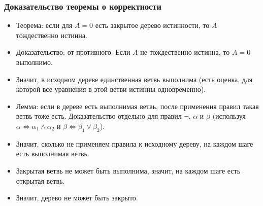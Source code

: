 \documentclass[10pt]{beamer}
\begin{document}
\begin{frame}
    \frametitle{Доказательство теоремы о корректности}
    \begin{itemize}
        \item Теорема: если для $A=0$ есть закрытое дерево истинности, то $A$ тождественно истинна.
        \item Доказательство: от противного. Если $A$ не тождественно истинна, то $A=0$ выполнимо.
        \pause
        \item Значит, в исходном дереве единственная ветвь выполнима (есть оценка, для которой все уравнения в этой ветви истинны одновременно).
        \pause
        \item Лемма: если в дереве есть выполнимая ветвь, после применения правил такая ветвь тоже есть. Доказательство отдельно для правил $\neg$, $\alpha$ и $\beta$ (используя $\alpha \Leftrightarrow \alpha_1 \land \alpha_2$ и $\beta \Leftrightarrow \beta_1 \lor \beta_2$).
        \pause
        \item Значит, сколько не применяем правила к исходному дереву, на каждом шаге есть выполнимая ветвь.
        \pause
        \item Закрытая ветвь не может быть выполнима, значит, на каждом шаге есть открытая ветвь.
        \item Значит, дерево не может быть закрыто.
    \end{itemize}
\end{frame}
\end{document}
